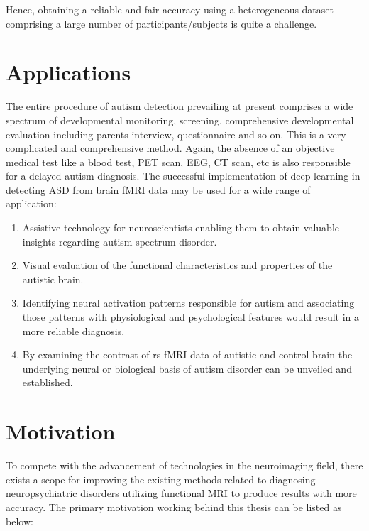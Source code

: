 Hence, obtaining a reliable and fair accuracy using a heterogeneous dataset comprising a large number of participants/subjects is quite a challenge. 

\section{Applications}
The entire procedure of autism detection prevailing at present comprises a wide spectrum of
developmental monitoring, screening, comprehensive developmental evaluation including
parents interview, questionnaire and so on. This is a very complicated and comprehensive
method. Again, the absence of an objective medical test like a blood test, PET scan, EEG, CT
scan, etc is also responsible for a delayed autism diagnosis. The successful implementation of
deep learning in detecting ASD from brain fMRI data may be used for a wide range of
application:\\

\begin{enumerate}
\item Assistive technology for neuroscientists enabling them to obtain valuable insights
regarding autism spectrum disorder.
\item Visual evaluation of the functional characteristics and properties of the autistic brain.
\item Identifying neural activation patterns responsible for autism and associating those
patterns with physiological and psychological features would result in a more reliable
diagnosis.
\item By examining the contrast of rs-fMRI data of autistic and control brain the underlying
neural or biological basis of autism disorder can be unveiled and established.
\end{enumerate}

\section{Motivation}
To compete with the advancement of technologies in the neuroimaging field, there exists a
scope for improving the existing methods related to diagnosing neuropsychiatric disorders
utilizing functional MRI to produce results with more accuracy. The primary motivation
working behind this thesis can be listed as below:\\

